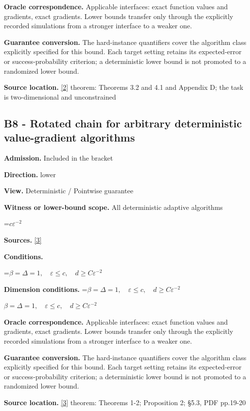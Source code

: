 \documentclass[10pt,a4paper]{article}
\newcommand{\AtlasMath}[1]{\par\begingroup\centering\setbox0=\hbox{$\displaystyle #1$}\ifdim\wd0>1.4\linewidth\typeout{ATLAS WIDE FORMULA: \the\wd0}\fi\ifdim\wd0>\linewidth\resizebox{\linewidth}{!}{\box0}\else\box0\fi\par\endgroup}
\newcommand{\AtlasInlineMath}[1]{\begingroup\setbox0=\hbox{$#1$}\ifdim\wd0>.4\linewidth\endgroup\AtlasMath{#1}\else\endgroup$#1$\fi}
\begin{document}
\textbf{Oracle correspondence.} Applicable interfaces: exact function values and gradients, exact gradients. Lower bounds transfer only through the explicitly recorded simulations from a stronger interface to a weaker one.

\textbf{Guarantee conversion.} The hard-instance quantifiers cover the algorithm class explicitly specified for this bound. Each target setting retains its expected-error or success-probability criterion; a deterministic lower bound is not promoted to a randomized lower bound.

\textbf{Source location.} \href{https://arxiv.org/pdf/2310.09157}{[2]} theorem: Theorems 3.2 and 4.1 and Appendix D; the task is two-dimensional and unconstrained

\subsection{B8 - Rotated chain for arbitrary deterministic value-gradient algorithms}
\textbf{Admission.} Included in the bracket

\textbf{Direction.} lower

\textbf{View.} Deterministic / Pointwise guarantee

\textbf{Witness or lower-bound scope.} All deterministic adaptive algorithms

\AtlasMath{c\varepsilon^{-2}}
\textbf{Sources.} \href{https://arxiv.org/pdf/1710.11606}{[3]}

\textbf{Conditions.} 


\AtlasMath{\beta=\Delta=1,\quad\varepsilon\le c,\quad d\ge C\varepsilon^{-2}}




\textbf{Dimension conditions.} \AtlasInlineMath{\beta=\Delta=1,\quad\varepsilon\le c,\quad d\ge C\varepsilon^{-2}}

\textbf{Oracle correspondence.} Applicable interfaces: exact function values and gradients, exact gradients. Lower bounds transfer only through the explicitly recorded simulations from a stronger interface to a weaker one.

\textbf{Guarantee conversion.} The hard-instance quantifiers cover the algorithm class explicitly specified for this bound. Each target setting retains its expected-error or success-probability criterion; a deterministic lower bound is not promoted to a randomized lower bound.

\textbf{Source location.} \href{https://arxiv.org/pdf/1710.11606}{[3]} theorem: Theorems 1-2; Proposition 2; §5.3, PDF pp.19-20
\end{document}
